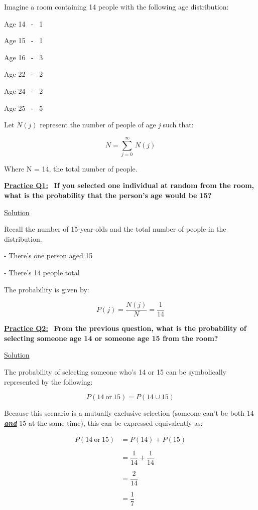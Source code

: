 Imagine a room containing 14 people with the following age distribution:

Age 14 \ - \ 1

Age 15 \ - \ 1

Age 16 \ - \ 3

Age 22 \ - \ 2

Age 24 \ - \ 2

Age 25 \ - \ 5

\bigskip

Let $N(j)$ represent the number of people of age \textit{j} such that:

\[
    N = \sum_{j=0}^{\infty} \, N(j)
\]

Where N = 14, the total number of people. 

\bigskip \bigskip

\underline{\textbf{Practice Q1:}} \ \textbf{If you selected one individual at
random from the room, what is the probability that the person's age would be
15?}

\bigskip

\underline{Solution}

Recall the number of 15-year-olds and the total number
of people in the distribution.

- There's one person aged 15

- There's 14 people total

\bigskip

The probability is given by:

\[
    P(j) = \dfrac{N(j)}{N} = \boxed{\dfrac{1}{14}}
\]

\bigskip \bigskip

\underline{\textbf{Practice Q2:}} \ \textbf{From the previous question, what is
the probability of selecting someone age 14 or someone age 15 from the room?}

\bigskip

\underline{Solution}

The probability of selecting someone who's 14 or 15 can be symbolically
represented by the following:

\[
    P(14 \ \text{or} \ 15) = P(14 \cup 15)
\]

\newpage

Because this scenario is a mutually exclusive selection (someone can't be both
14 \textit{\textbf{\underline{and}}} 15 at the same time), this can be expressed
equivalently as:

\begin{align*}
    P(14 \ \text{or} \ 15) &= P(14) + P(15) \\ \\
    &= \dfrac{1}{14} + \dfrac{1}{14} \\ \\
    &= \dfrac{2}{14} \\ \\
    &= \boxed{\dfrac{1}{7}}
\end{align*}


